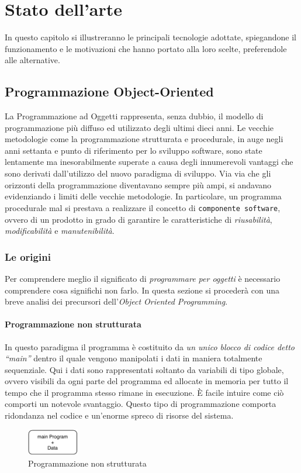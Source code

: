 \chapter{Stato dell'arte}
\label{chap:stateofart}
In questo capitolo si illustreranno le principali tecnologie adottate, spiegandone il funzionamento e le motivazioni che hanno portato alla loro scelte, preferendole alle alternative.

\section{Programmazione Object-Oriented}
La Programmazione ad Oggetti rappresenta, senza dubbio, il modello di programmazione più diffuso ed utilizzato degli ultimi dieci anni.
Le vecchie metodologie come la programmazione strutturata e procedurale, in auge negli anni settanta e punto di riferimento per lo sviluppo software, sono state lentamente ma inesorabilmente superate a causa degli innumerevoli vantaggi che sono derivati dall’utilizzo del nuovo paradigma di sviluppo. Via via che gli orizzonti della programmazione diventavano sempre più ampi, si andavano evidenziando i limiti delle vecchie metodologie. In particolare, un programma procedurale mal si prestava a realizzare il concetto di \texttt{componente software}, ovvero di un prodotto in grado di garantire le caratteristiche di \textit{riusabilità}, \textit{modificabilità} e \textit{manutenibilità}.
\subsection{Le origini}
Per comprendere meglio il significato di \textsl{programmare per oggetti} è necessario comprendere cosa significhi non farlo. In questa sezione si procederà con una breve analisi dei precursori dell'\textit{Object Oriented Programming}.

\subsubsection{Programmazione non strutturata}
 In questo paradigma il programma è costituito da \textit{un unico blocco di codice detto “main”} dentro il quale vengono manipolati i dati in maniera totalmente sequenziale. Qui i dati sono rappresentati soltanto da variabili di tipo globale, ovvero visibili da ogni parte del programma ed allocate in memoria per tutto il tempo che il programma stesso rimane in esecuzione. È facile intuire come ciò comporti un notevole svantaggio. Questo tipo di programmazione comporta ridondanza nel codice e un'enorme spreco di risorse del sistema.
\begin{figure}[H]
    \centering
    \includegraphics[width=0.20\textwidth]{images/01_1_non_structured_data.pdf}
    \caption{Programmazione non strutturata}
    \label{fig:nonstructured-programming}
\end{figure}

